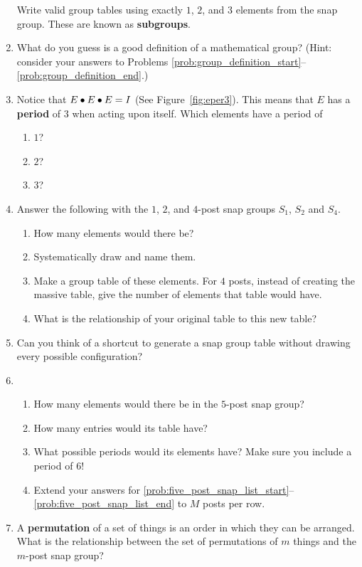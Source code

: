 \documentclass[../gatm.tex]{subfiles}
\begin{document}
\begin{enumerate}
	      Write valid group tables using exactly $1$, $2$, and $3$ elements from the snap group. These are known as \textbf{subgroups}.\label{prob:group_definition_end}
	\item What do you guess is a good definition of a mathematical group?
	      (Hint: consider your answers to Problems \ref{prob:group_definition_start}--\ref{prob:group_definition_end}.)
	\item Notice that $E\bullet E\bullet E=I$ (See Figure~\ref{fig:eper3}).
	      This means that $E$ has a \textbf{period} of $3$ when acting upon itself.
	      Which elements have a period of
	      \begin{multicols}{3}
		      \begin{enumerate}
			      \item $1$?
			      \item $2$?
			      \item $3$?
		      \end{enumerate}
	      \end{multicols}
	\item Answer the following with the $1$, $2$, and $4$-post snap groups $S_1$, $S_2$ and $S_4$.\begin{enumerate}
		      \item How many elements would there be?
		      \item Systematically draw and name them.
		      \item Make a group table of these elements.
		            For $4$ posts, instead of creating the massive table, give the number of elements that table would have.
		      \item What is the relationship of your original table to this new table?
	      \end{enumerate}
	\item Can you think of a shortcut to generate a snap group table without drawing every possible configuration?
	\item \begin{enumerate}
		      \item How many elements would there be in the $5$-post snap group? \label{prob:five_post_snap_list_start}
		      \item How many entries would its table have?
		      \item What possible periods would its elements have? Make sure you include a period of $6$! \label{prob:five_post_snap_list_end}
		      \item Extend your answers for \ref{prob:five_post_snap_list_start}--\ref{prob:five_post_snap_list_end} to $M$ posts per row.
	      \end{enumerate}
	\item A \textbf{permutation} of a set of things is an order in which they can be arranged.
	      What is the relationship between the set of permutations of $m$ things and the $m$-post snap group?
\end{enumerate}
\end{document}
